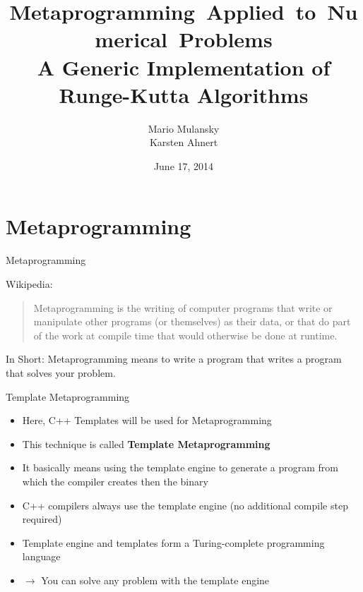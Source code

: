 \documentclass{beamer}
\title[{Metaprogramming Applied to Numerical Problems}]{\hbox{Metaprogramming Applied to Numerical Problems} \\ {\small A Generic Implementation of Runge-Kutta Algorithms}}
\author[Mario Mulansky]{Mario Mulansky\\ \small{Karsten Ahnert}}
\date{June 17, 2014}
\institute{C++ Usergroup Berlin}
\begin{document}
\begin{frame}
\titlepage
\end{frame}

\section{Metaprogramming}

\begin{frame}{Metaprogramming}

\begin{block}{Wikipedia:}
\begin{quote}
 Metaprogramming is the writing of computer programs that write or manipulate other programs (or themselves) as their data, or that do part of the work at compile time that would otherwise be done at runtime.\\
\end{quote}
\end{block}

\pause
\begin{block}{In Short:}
 Metaprogramming means to write a program that writes a program that solves your problem.
\end{block}

\end{frame}

% 
% 
% 
% 

\begin{frame}{Template Metaprogramming}
 \begin{itemize}
  \item Here, C++ Templates will be used for Metaprogramming
  \item This technique is called \textbf{Template Metaprogramming}
  \item It basically means using the template engine to generate a program from which the compiler creates then the binary
	\item C++ compilers always use the template engine (no additional compile step required)
 \end{itemize}

 \pause

 \begin{itemize}
	 \item Template engine and templates form a Turing-complete programming language
	 \item $\longrightarrow$ You can solve any problem with the template engine
 \end{itemize}

\end{frame}
\end{document}
